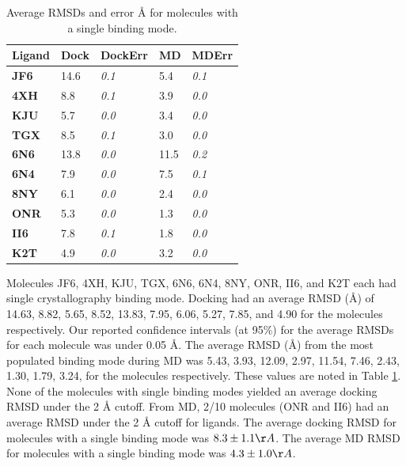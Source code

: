 \begin{table}[]
\begin{tabular}{|l|l|l|l|l|}
\hline
\textbf{Ligand} & \textbf{Dock} & \textbf{DockErr} & \textbf{MD} & \textbf{MDErr} \\ \hline
\textbf{JF6}    & 14.6          & \textit{0.1}     & 5.4         & \textit{0.1}   \\ \hline
\textbf{4XH}    & 8.8           & \textit{0.1}     & 3.9         & \textit{0.0}   \\ \hline
\textbf{KJU}    & 5.7           & \textit{0.0}     & 3.4         & \textit{0.0}   \\ \hline
\textbf{TGX}    & 8.5           & \textit{0.1}     & 3.0         & \textit{0.0}   \\ \hline
\textbf{6N6}    & 13.8          & \textit{0.0}     & 11.5        & \textit{0.2}   \\ \hline
\textbf{6N4}    & 7.9           & \textit{0.0}     & 7.5         & \textit{0.1}   \\ \hline
\textbf{8NY}    & 6.1           & \textit{0.0}     & 2.4         & \textit{0.0}   \\ \hline
\textbf{ONR}    & 5.3           & \textit{0.0}     & 1.3         & \textit{0.0}   \\ \hline
\textbf{II6}    & 7.8           & \textit{0.1}     & 1.8         & \textit{0.0}   \\ \hline
\textbf{K2T}    & 4.9           & \textit{0.0}     & 3.2         & \textit{0.0}   \\ \hline
\end{tabular}
\caption{Average RMSDs and error {\AA} for molecules with a single binding mode.}
\label{table:singlebm}
\end{table}


Molecules JF6, 4XH, KJU, TGX, 6N6, 6N4,  8NY, ONR, II6, and K2T each had single crystallography binding mode.
Docking had an average RMSD ({\AA}) of 14.63, 8.82, 5.65, 8.52, 13.83, 7.95, 6.06, 5.27, 7.85, and 4.90 for the molecules respectively.
Our reported confidence intervals (at 95\%) for the average RMSDs for each molecule was under 0.05 {\AA}.
The average RMSD ({\AA}) from the most populated binding mode during MD was 5.43, 3.93, 12.09, 2.97, 11.54, 7.46, 2.43, 1.30, 1.79, 3.24, for the molecules respectively.
These values are noted in Table \ref{table:singlebm}.
None of the molecules with single binding modes yielded an average docking RMSD under the 2 {\AA} cutoff.
From MD, 2/10 molecules (ONR and II6) had an average RMSD under the 2 {\AA} cutoff for ligands.
The average docking RMSD for molecules with a single binding mode was $8.3 \pm 1.1 {\AA}$.
The average MD RMSD for molecules with a single binding mode was $4.3 \pm 1.0 {\AA}$.

